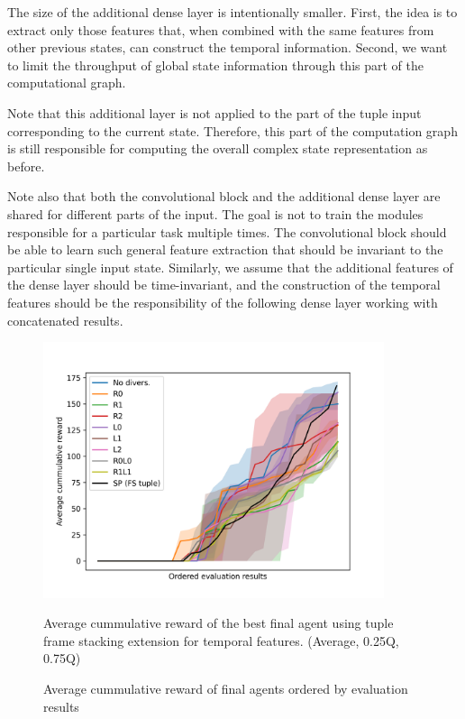 The size of the additional dense layer is intentionally smaller.
First, the idea is to extract only those features that, when combined with the same features from other previous states, can construct the temporal information.
Second, we want to limit the throughput of global state information through this part of the computational graph.

Note that this additional layer is not applied to the part of the tuple input corresponding to the current state.
Therefore, this part of the computation graph is still responsible for computing the overall complex state representation as before.

Note also that both the convolutional block and the additional dense layer are shared for different parts of the input.
The goal is not to train the modules responsible for a particular task multiple times.
The convolutional block should be able to learn such general feature extraction that should be invariant to the particular single input state.
Similarly, we assume that the additional features of the dense layer should be time-invariant, and the construction of the temporal features should be the responsibility of the following dense layer working with concatenated results.

\begin{figure}[!ht]
    \centering
    \includegraphics*[width=10cm]{../img/FSTupleOrderedAvg.png}

    \caption{Average cummulative reward of final agents ordered by evaluation results}
    \label{FSTupleOrderedAvg}
    \medskip
    \small 
    Average cummulative reward of the best final agent using tuple frame stacking extension for temporal features.    
    (Average, 0.25Q, 0.75Q)

\end{figure}

